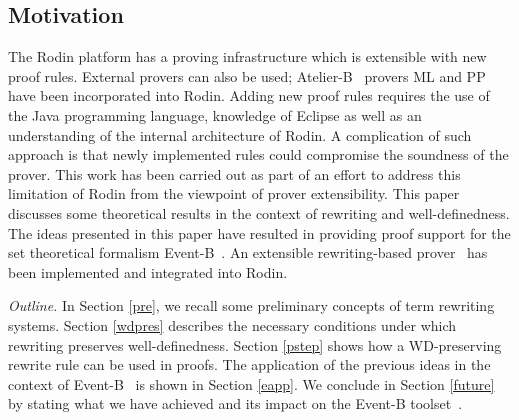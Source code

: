 \documentclass[copyright]{eptcs}
\begin{document}
\subsection{Motivation}
The Rodin platform has a proving infrastructure which is extensible with new proof rules. External provers can also be used; Atelier-B~\cite{abrial_03_clickn} provers ML and PP have been incorporated into Rodin. Adding new proof rules requires the use of the Java programming language, knowledge of Eclipse as well as an understanding of the internal architecture of Rodin. A complication of such approach is that newly implemented rules could compromise the soundness of the prover. This work has been carried out as part of an effort to address this limitation of Rodin from the viewpoint of prover extensibility. This paper discusses some theoretical results in the context of rewriting and well-definedness. The ideas presented in this paper have resulted in providing proof support for the set theoretical formalism Event-B~\cite{1365974}. An extensible rewriting-based prover~\cite{issam1984} has been implemented and integrated into Rodin. 
\par
\textit{Outline.} In Section \ref{pre}, we recall some preliminary concepts of term rewriting systems. Section \ref{wdpres} describes the necessary conditions under which rewriting preserves well-definedness. Section \ref{pstep} shows how a WD-preserving rewrite rule can be used in proofs. The application of the previous ideas in the context of Event-B~\cite{1365974} is shown in Section \ref{eapp}. We conclude in Section \ref{future} by stating what we have achieved and its impact on the Event-B toolset~\cite{3056425}.
\end{document}
